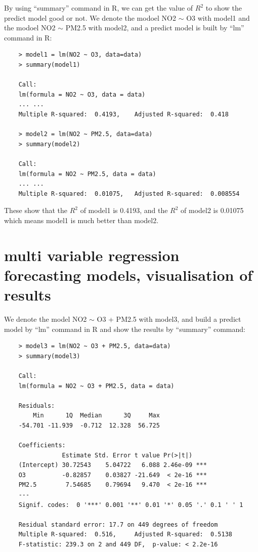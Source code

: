 \documentclass[a4paper,11pt,reqno]{report}
\begin{document}
By using ``summary'' command in R, we can get the value of $R^2$ to show the predict model good or not.
We denote the modoel NO2 $\sim$ O3 with model1 and the modoel NO2 $\sim$ PM2.5 with model2, and a predict model is built by ``lm'' command in R:
\begin{lstlisting}
    > model1 = lm(NO2 ~ O3, data=data)
    > summary(model1)

    Call:
    lm(formula = NO2 ~ O3, data = data)
    ... ...
    Multiple R-squared:  0.4193,    Adjusted R-squared:  0.418

    > model2 = lm(NO2 ~ PM2.5, data=data)
    > summary(model2)

    Call:
    lm(formula = NO2 ~ PM2.5, data = data)
    ... ...
    Multiple R-squared:  0.01075,   Adjusted R-squared:  0.008554 
\end{lstlisting}
These show that the $R^2$ of model1 is 0.4193, and the $R^2$ of model2 is 0.01075 which means model1 is much better than model2.
\section{multi variable regression forecasting models, visualisation of results}
\label{sec:multi variable regression forecasting models, visualisation of results}
We denote the model NO2 $\sim$ O3 + PM2.5 with model3, and build a predict model by ``lm'' command in R and show the results by ``summary'' command:
\begin{lstlisting}
    > model3 = lm(NO2 ~ O3 + PM2.5, data=data)
    > summary(model3)

    Call:
    lm(formula = NO2 ~ O3 + PM2.5, data = data)

    Residuals:
        Min      1Q  Median      3Q     Max
    -54.701 -11.939  -0.712  12.328  56.725

    Coefficients:
                Estimate Std. Error t value Pr(>|t|)
    (Intercept) 30.72543    5.04722   6.088 2.46e-09 ***
    O3          -0.82857    0.03827 -21.649  < 2e-16 ***
    PM2.5        7.54685    0.79694   9.470  < 2e-16 ***
    ---
    Signif. codes:  0 '***' 0.001 '**' 0.01 '*' 0.05 '.' 0.1 ' ' 1

    Residual standard error: 17.7 on 449 degrees of freedom
    Multiple R-squared:  0.516,     Adjusted R-squared:  0.5138
    F-statistic: 239.3 on 2 and 449 DF,  p-value: < 2.2e-16
\end{lstlisting}
\end{document}

